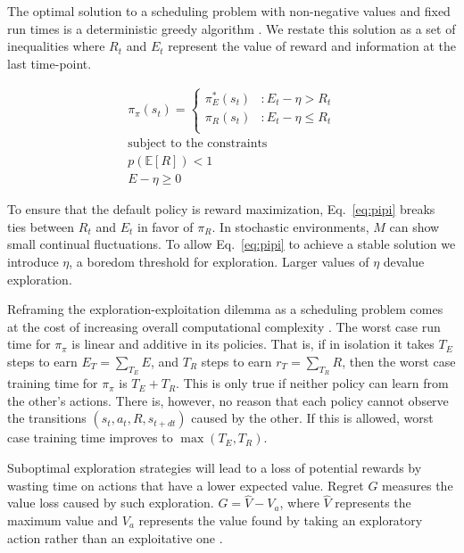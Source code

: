 \documentclass[12pt]{article}
\begin{document}
The optimal solution to a scheduling problem with non-negative values and fixed run times is a deterministic greedy algorithm \cite{Roughgarden2019}. We restate this solution as a set of inequalities where $R_t$ and $E_t$ represent the value of reward and information at the last time-point.

\begin{equation}
\label{eq:pipi} 
	\begin{split}
		\pi_{\pi}(s_t) = 
		\begin{cases}
			\pi^*_E(s_t) & : E_t - \eta > R_t \\
			\pi_R(s_t) & : E_t - \eta \le R_t \\
		\end{cases}
		\\
		\text{subject to the constraints}\\
		p(\mathbb E[R]) < 1 \\
		E - \eta \geq 0
	\end{split}
\end{equation}

To ensure that the default policy is reward maximization, Eq.~\ref{eq:pipi} breaks ties between $R_t$ and $E_t$ in favor of $\pi_R$. In stochastic environments, $M$ can show small continual fluctuations. To allow Eq.~\ref{eq:pipi} to achieve a stable solution we introduce $\eta$, a boredom threshold for exploration. Larger values of $\eta$ devalue exploration.

Reframing the exploration-exploitation dilemma as a scheduling problem comes at the cost of increasing overall computational complexity \cite{Valiant1984}. The worst case run time for $\pi_{\pi}$ is linear and additive in its policies. That is, if in isolation it takes $T_E$ steps to earn $E_{T} = \sum_{T_E} E$, and $T_R$ steps to earn $r_{T} = \sum_{T_R} R$, then the worst case training time for $\pi_{\pi}$ is $T_E + T_R$. This is only true  if neither policy can learn from the other's actions. There is, however, no reason that each policy cannot observe the transitions $(s_t, a_t, R, s_{t+dt})$ caused by the other. If this is allowed, worst case training time improves to $\max(T_E, T_R)$.

Suboptimal exploration strategies will lead to a loss of potential rewards by wasting time on actions that have a lower expected value. Regret $G$ measures the value loss caused by such exploration. $G = \hat V - V_a$, where $\hat V$ represents the maximum value and $V_a$ represents the value found by taking an exploratory action rather than an exploitative one \cite{Sutton2018}. 
\end{document}
